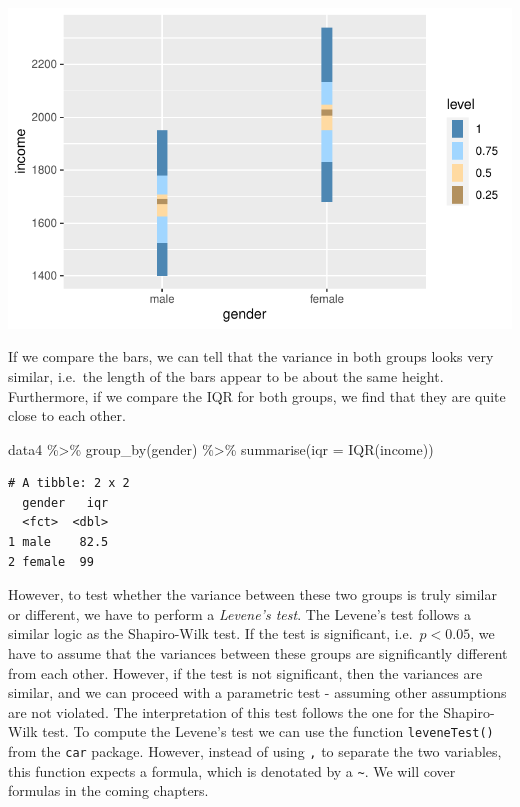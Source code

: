 \documentclass[
  letterpaper,
]{krantz}
\makeatletter
\newenvironment{Shaded}{\begin{snugshade}}{\end{snugshade}}
\newcommand{\AttributeTok}[1]{\textcolor[rgb]{0.40,0.45,0.13}{#1}}
\newcommand{\FunctionTok}[1]{\textcolor[rgb]{0.28,0.35,0.67}{#1}}
\newcommand{\NormalTok}[1]{\textcolor[rgb]{0.00,0.23,0.31}{#1}}
\newcommand{\SpecialCharTok}[1]{\textcolor[rgb]{0.37,0.37,0.37}{#1}}
\newenvironment{kframe}{%
\medskip{}
\setlength{\fboxsep}{.8em}
 \def\at@end@of@kframe{}%
 \ifinner\ifhmode%
  \def\at@end@of@kframe{\end{minipage}}%
  \begin{minipage}{\columnwidth}%
 \fi\fi%
 \def\FrameCommand##1{\hskip\@totalleftmargin \hskip-\fboxsep
 \colorbox{shadecolor}{##1}\hskip-\fboxsep
     \hskip-\linewidth \hskip-\@totalleftmargin \hskip\columnwidth}%
 \MakeFramed {\advance\hsize-\width
   \@totalleftmargin\z@ \linewidth\hsize
   \@setminipage}}%
 {\par\unskip\endMakeFramed%
 \at@end@of@kframe}
\renewenvironment{Shaded}{\begin{kframe}}{\end{kframe}}
\makeatother
\begin{document}
\includegraphics{09_sources_of_bias_files/figure-pdf/homogeneity-variance-alt-vis-1.pdf}

If we compare the bars, we can tell that the variance in both groups
looks very similar, i.e.~the length of the bars appear to be about the
same height. Furthermore, if we compare the IQR for both groups, we find
that they are quite close to each other.

\begin{Shaded}
\begin{Highlighting}[]
\NormalTok{data4 }\SpecialCharTok{\%\textgreater{}\%}
  \FunctionTok{group\_by}\NormalTok{(gender) }\SpecialCharTok{\%\textgreater{}\%}
  \FunctionTok{summarise}\NormalTok{(}\AttributeTok{iqr =} \FunctionTok{IQR}\NormalTok{(income))}
\end{Highlighting}
\end{Shaded}

\begin{verbatim}
# A tibble: 2 x 2
  gender   iqr
  <fct>  <dbl>
1 male    82.5
2 female  99  
\end{verbatim}

However, to test whether the variance between these two groups is truly
similar or different, we have to perform a \emph{Levene's test}. The
Levene's test follows a similar logic as the Shapiro-Wilk test. If the
test is significant, i.e.~\(p < 0.05\), we have to assume that the
variances between these groups are significantly different from each
other. However, if the test is not significant, then the variances are
similar, and we can proceed with a parametric test - assuming other
assumptions are not violated. The interpretation of this test follows
the one for the Shapiro-Wilk test. To compute the Levene's test we can
use the function \texttt{leveneTest()} from the \texttt{car} package.
However, instead of using \texttt{,} to separate the two variables, this
function expects a formula, which is denotated by a
\texttt{\textasciitilde{}}. We will cover formulas in the coming
chapters.
\end{document}
